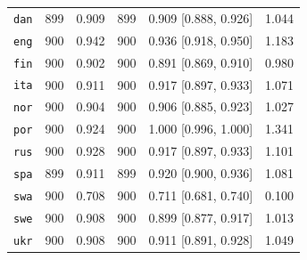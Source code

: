 \begin{table}[htbp]
\begin{minipage}[t]{0.485\linewidth}
{\begin{tabular}{@{}lrrrrr@{}}
\texttt{dan} & 899 & 0.909 & 899 & 0.909 [0.888, 0.926] & 1.044 \\
\texttt{eng} & 900 & 0.942 & 900 & 0.936 [0.918, 0.950] & 1.183 \\
\texttt{fin} & 900 & 0.902 & 900 & 0.891 [0.869, 0.910] & 0.980 \\
\texttt{ita} & 900 & 0.911 & 900 & 0.917 [0.897, 0.933] & 1.071 \\
\texttt{nor} & 900 & 0.904 & 900 & 0.906 [0.885, 0.923] & 1.027 \\
\texttt{por} & 900 & 0.924 & 900 & 1.000 [0.996, 1.000] & 1.341 \\
\texttt{rus} & 900 & 0.928 & 900 & 0.917 [0.897, 0.933] & 1.101 \\
\texttt{spa} & 899 & 0.911 & 899 & 0.920 [0.900, 0.936] & 1.081 \\
\texttt{swa} & 900 & 0.708 & 900 & 0.711 [0.681, 0.740] & 0.100 \\
\texttt{swe} & 900 & 0.908 & 900 & 0.899 [0.877, 0.917] & 1.013 \\
\texttt{ukr} & 900 & 0.908 & 900 & 0.911 [0.891, 0.928] & 1.049 \\
\bottomrule
\end{tabular}}
\end{minipage}
\end{table}

